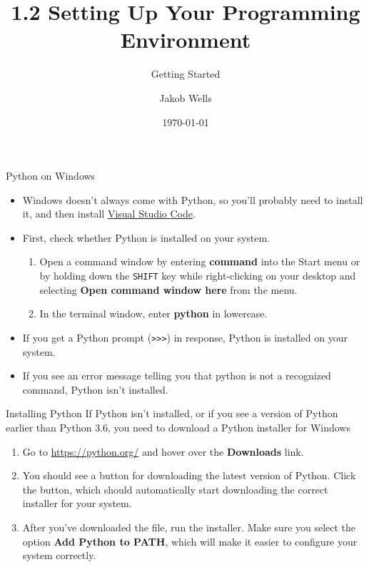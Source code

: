 \documentclass[aspectratio=169]{beamer}
\title{1.2 Setting Up Your Programming Environment}
\subtitle{Getting Started}
\author{Jakob Wells}
\begin{document}
\date{\today}


\begin{frame}
    \titlepage{}
\end{frame}


\begin{frame}[fragile]{Python on Windows}
    \begin{itemize}[label=--]
        \item Windows doesn't always come with Python, so you'll probably need to install it, and then install \href{https://code.visualstudio.com/Download}{Visual Studio Code}. \\
        \item First, check whether Python is installed on your system.
            \begin{enumerate}[label={\arabic*.},itemsep=5pt]
                \item Open a command window by entering \textbf{command} into the Start menu or by holding down the \texttt{SHIFT} key while right-clicking on your desktop and selecting \textbf{Open command window here} from the menu.
                \item In the terminal window, enter \textbf{python} in lowercase.
            \end{enumerate}
        \item If you get a Python prompt (\verb|>>>|) in response, Python is installed on your system.
        \item If you see an error message telling you that python is not a recognized command, Python isn’t installed.
    \end{itemize}
\end{frame}


\begin{frame}{Installing Python}
    If Python isn't installed, or if you see a version of Python earlier than Python 3.6, you need to download a Python installer for Windows
    \begin{enumerate}[label={\arabic*.},itemsep=5pt]
        \item Go to \href{https://python.org/}{https://python.org/} and hover over the \textbf{Downloads} link.
        \item You should see a button for downloading the latest version of Python.
            Click the button, which should automatically start downloading the correct installer for your system.
        \item After you've downloaded the file, run the installer.
            Make sure you select the option \textbf{Add Python to PATH}, which will make it easier to configure your system correctly.
    \end{enumerate}
\end{frame}
\end{document}
